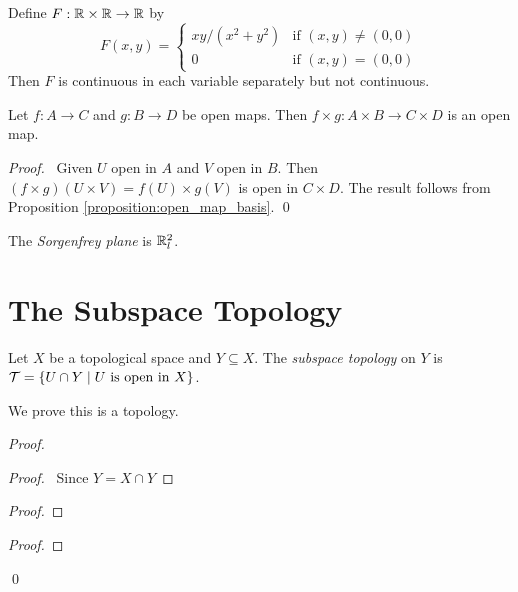 \begin{example}
    Define $F : \mathbb{R} \times \mathbb{R} \rightarrow \mathbb{R}$ by
    \[ F(x,y) = \begin{cases}
        xy / (x^2 + y^2) & \text{if } (x,y) \neq (0,0) \\
        0 & \text{if } (x,y) = (0,0)
    \end{cases} \]
    Then $F$ is continuous in each variable separately but not continuous.
\end{example}

\begin{proposition}
    \label{proposition:open_map_product}
    Let $f : A \rightarrow C$ and $g : B \rightarrow D$ be open maps. Then $f \times g : A \times B \rightarrow C \times D$ is an open map.
\end{proposition}

\begin{proof}
    \pf\ Given $U$ open in $A$ and $V$ open in $B$. Then $(f \times g)(U \times V) = f(U) \times g(V)$ is open in $C \times D$.
    The result follows from Proposition \ref{proposition:open_map_basis}. \qed
\end{proof}

\begin{definition}
    The \emph{Sorgenfrey plane} is $\mathbb{R}_l^2$.    
\end{definition}

\section{The Subspace Topology}

\begin{definition}
    Let $X$ be a topological space and $Y \subseteq X$. The \emph{subspace topology} on $Y$ is
    $\mathcal{T} = \{ U \cap Y \mid U \text{ is open in } X \}$.
\end{definition}

We prove this is a topology.

\begin{proof}
    \pf
    \begin{proof}
        \pf\ Since $Y = X \cap Y$
    \end{proof}
    \begin{proof}
    \end{proof}
    \begin{proof}
    \end{proof}
    \qed
\end{proof}


